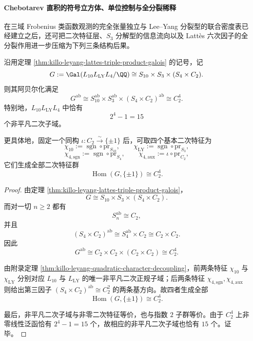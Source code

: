 \paragraph{Chebotarev 直积的符号立方体、单位控制与全分裂稀释}
在三域 Frobenius 类函数观测的完全张量独立与 Lee--Yang 分裂型的联合密度表已经建立之后，还可把二次特征层、\(S_3\) 分解型的信息流向以及 Latt\`es 六次因子的全分裂作用进一步压缩为下列三条结构后果。

\begin{theorem}\label{thm:xi-time-part62e-triple-product-abelianization-c2-four}
沿用定理 \ref{thm:killo-leyang-lattes-triple-product-galois} 的记号，记
\[
G:=\Gal(L_{10}L_{\mathrm{LY}}L_4/\QQ)
\cong
S_{10}\times S_3\times (S_4\times C_2).
\]
则其阿贝尔化满足
\[
\boxed{\;
G^{\mathrm{ab}}
\cong
S_{10}^{\mathrm{ab}}\times S_3^{\mathrm{ab}}\times (S_4\times C_2)^{\mathrm{ab}}
\cong C_2^4.\;}
\]
特别地，\(L_{10}L_{\mathrm{LY}}L_4\) 中恰有
\[
\boxed{\;2^4-1=15\;}
\]
个非平凡二次子域。

更具体地，固定一个同构 \(\iota:C_2\xrightarrow{\sim}\{\pm1\}\) 后，可取四个基本二次特征为
\[
\chi_{10}:=\operatorname{sgn}\circ \mathrm{pr}_{S_{10}},
\qquad
\chi_{\mathrm{LY}}:=\operatorname{sgn}\circ \mathrm{pr}_{S_3},
\]
\[
\chi_{4,\mathrm{sgn}}:=\operatorname{sgn}\circ \mathrm{pr}_{S_4},
\qquad
\chi_{4,\mathrm{aux}}:=\iota\circ \mathrm{pr}_{C_2},
\]
它们生成全部二次特征群
\[
\operatorname{Hom}(G,\{\pm1\})\cong C_2^4.
\]
\end{theorem}
\begin{proof}
由定理 \ref{thm:killo-leyang-lattes-triple-product-galois}，
\[
G\cong S_{10}\times S_3\times (S_4\times C_2).
\]
而对一切 \(n\ge 2\) 都有
\[
S_n^{\mathrm{ab}}\cong C_2,
\]
并且
\[
(S_4\times C_2)^{\mathrm{ab}}
\cong
S_4^{\mathrm{ab}}\times C_2
\cong
C_2\times C_2.
\]
因此
\[
G^{\mathrm{ab}}
\cong
C_2\times C_2\times (C_2\times C_2)
\cong
C_2^4.
\]

由附录定理 \ref{thm:killo-leyang-quadratic-character-decoupling}，前两条特征 \(\chi_{10}\) 与 \(\chi_{\mathrm{LY}}\) 分别对应 \(L_{10}\) 与 \(L_{\mathrm{LY}}\) 的唯一非平凡二次正规子域；后两条特征 \(\chi_{4,\mathrm{sgn}},\chi_{4,\mathrm{aux}}\) 则给出第三因子 \((S_4\times C_2)^{\mathrm{ab}}\cong C_2^2\) 的两条基方向。故四者生成全部
\[
\operatorname{Hom}(G,\{\pm1\})\cong C_2^4.
\]

最后，非平凡二次子域与非零二次特征等价，也与指数 \(2\) 子群等价。由于 \(C_2^4\) 上非零线性泛函恰有 \(2^4-1=15\) 个，故相应的非平凡二次子域也恰有 \(15\) 个。证毕。
\end{proof}

